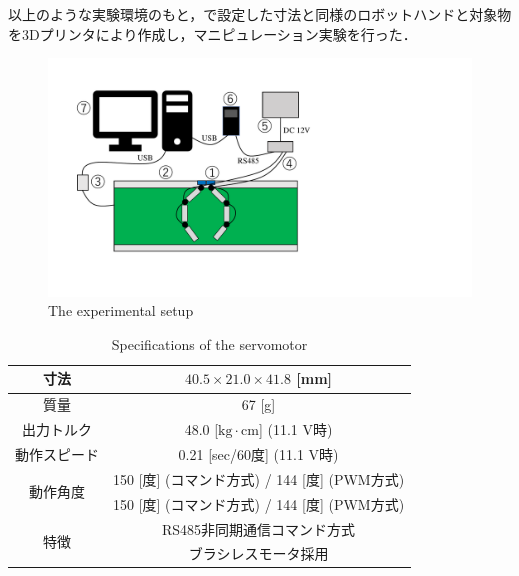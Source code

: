 \documentclass[a4paper,twoside,12pt,papersize, dvipdfmx]{iirthesis}
\begin{document}
以上のような実験環境のもと，で設定した寸法と同様のロボットハンドと対象物を3Dプリンタにより作成し，マニピュレーション実験を行った．

\begin{figure}[b]
    \centering
    \includegraphics[width=1.\columnwidth, clip]{fig/4-manipulation-result/setup.pdf}
    \caption{The experimental setup \cite{kamikukita2022}}
    \label{fig::experimental-setup}
\end{figure}
\begin{table}[b]
    \centering
    \caption{Specifications of the servomotor}
    \begin{tabular}{|c|c|}
    \hline
    寸法 & $40.5 \times 21.0 \times 41.8$ [mm] \\
    \hline
    質量 & 67 [g] \\
    \hline
    出力トルク & 48.0 [$\mathrm{kg} \cdot \mathrm{cm}$] (11.1 V時) \\
    \hline
    動作スピード & 0.21 [sec/60度] (11.1 V時) \\
    \hline
    \multirow{2}{*}{動作角度} & 150 [度] (コマンド方式) / 144 [度] (PWM方式) \\
            & 150 [度] (コマンド方式) / 144 [度] (PWM方式) \\
    \hline
    \multirow{2}{*}{特徴} & RS485非同期通信コマンド方式 \\
        & ブラシレスモータ採用 \\
    \hline
    \end{tabular}
    \label{table::servo}
\end{table}
\end{document}
